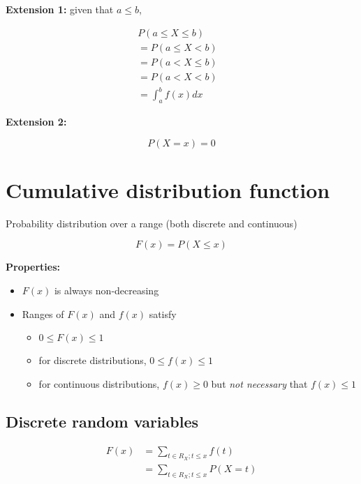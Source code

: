 \documentclass[twocolumn, 8pt]{extarticle}
\begin{document}
\textbf{Extension 1:} given that $a \leq b$, 

\begin{equation*}
\begin{split}
P(a \leq X \leq b) &\\
= P(a \leq X < b) \\
= P(a < X \leq b) \\
= P(a < X < b) \\
= \int_{a}^{b} f(x) dx
\end{split}
\end{equation*}

\textbf{Extension 2:}

$$
P(X = x) = 0
$$

\section*{Cumulative distribution function}

Probability distribution over a range (both discrete and continuous)

$$
F(x) = P(X \leq x)
$$

\textbf{Properties:}

\begin{itemize}
    \item $F(x)$ is always non-decreasing
    \item Ranges of $F(x)$ and $f(x)$ satisfy
        \begin{itemize}
            \item $0 \leq F(x) \leq 1$
            \item for discrete distributions, $0 \leq f(x) \leq 1$
            \item for continuous distributions, $f(x) \geq 0$ but \textit{not necessary} that $f(x) \leq 1$
        \end{itemize}
\end{itemize}

\subsection*{Discrete random variables}

\begin{equation*}
    \begin{split}
        F(x) & = \sum_{t \in R_X; t \leq x} f(t) \\
        & = \sum_{t \in R_X; t \leq x} P(X = t)
    \end{split}
\end{equation*}
\end{document}
